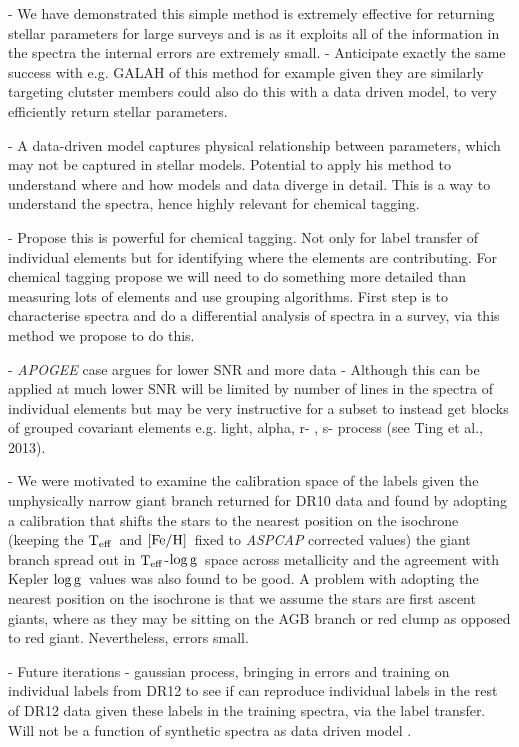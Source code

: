 \documentclass[12pt, preprint]{aastex}
\newcommand{\teff}{\mbox{$\rm T_{eff}$}}
\newcommand{\feh}{\mbox{$\rm [Fe/H]$}}
\newcommand{\logg}{\mbox{$\rm \log g$}}
\begin{document}
- We have demonstrated this simple method is extremely effective for returning stellar parameters for large surveys and is as it exploits all of the information in the spectra the internal errors are extremely small. - Anticipate exactly the same success with e.g. GALAH of this method for example given they are similarly targeting clutster members could also do this with a data driven model, to very efficiently return stellar parameters. 

- A data-driven model captures physical relationship between parameters, which may not be captured in stellar models. Potential to apply his method to understand where and how models and data diverge in detail. This is a way to understand the spectra, hence highly relevant for chemical tagging. 

- Propose this is powerful for chemical tagging. Not only for label transfer of individual elements but for identifying where the elements are contributing. For chemical tagging propose we will need to do something more detailed than measuring lots of elements and use grouping algorithms. First step is to characterise spectra and do a differential analysis of spectra in a survey, via this method we propose to do this. 

- \textit{APOGEE} case argues for lower SNR and more data - Although this can be applied at much lower SNR will be limited by number of lines in the spectra of individual elements but may be very instructive for a subset to instead get blocks of grouped covariant elements e.g. light, alpha, r- , s- process (see Ting et al., 2013).


- We were motivated to examine the calibration space of the labels given the unphysically narrow giant branch returned for DR10 data and found by adopting a calibration that shifts the stars to the nearest position on the isochrone (keeping the \teff\ and \feh\ fixed to \textit{ASPCAP} corrected values) the giant branch spread out in \teff-\logg\ space across metallicity and the agreement with Kepler \logg\ values was also found to be good. A problem with adopting the nearest position on the isochrone is that we assume the stars are first ascent giants, where as they may be sitting on the AGB branch or red clump as opposed to red giant. Nevertheless, errors small. 

- Future iterations - gaussian process, bringing in errors and training on individual labels from DR12 to see if can reproduce individual labels in the rest of DR12 data given these labels in the training spectra, via the label transfer. Will not be a function of synthetic spectra as data driven model . 
\end{document}
